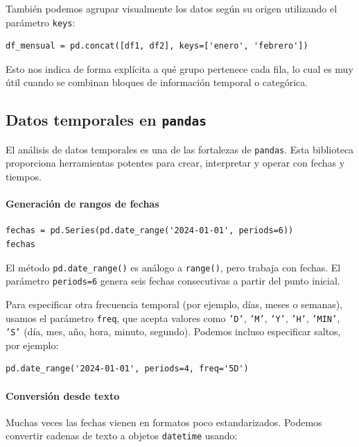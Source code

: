 \documentclass{article}
\theoremstyle{nonumberplain}
\begin{document}
También podemos agrupar visualmente los datos según su origen utilizando el parámetro \texttt{keys}:

\begin{verbatim}
df_mensual = pd.concat([df1, df2], keys=['enero', 'febrero'])
\end{verbatim}

Esto nos indica de forma explícita a qué grupo pertenece cada fila, lo cual es muy útil cuando se combinan bloques de información temporal o categórica.

\subsection*{Datos temporales en \texttt{pandas}}

El análisis de datos temporales es una de las fortalezas de \texttt{pandas}. Esta biblioteca proporciona herramientas potentes para crear, interpretar y operar con fechas y tiempos.

\paragraph{Generación de rangos de fechas}

\begin{verbatim}
fechas = pd.Series(pd.date_range('2024-01-01', periods=6))
fechas
\end{verbatim}

El método \texttt{pd.date\_range()} es análogo a \texttt{range()}, pero trabaja con fechas. El parámetro \texttt{periods=6} genera seis fechas consecutivas a partir del punto inicial.

Para especificar otra frecuencia temporal (por ejemplo, días, meses o semanas), usamos el parámetro \texttt{freq}, que acepta valores como \texttt{'D'}, \texttt{'M'}, \texttt{'Y'}, \texttt{'H'}, \texttt{'MIN'}, \texttt{'S'} (día, mes, año, hora, minuto, segundo). Podemos incluso especificar saltos, por ejemplo:

\begin{verbatim}
pd.date_range('2024-01-01', periods=4, freq='5D')
\end{verbatim}

\paragraph{Conversión desde texto}

Muchas veces las fechas vienen en formatos poco estandarizados. Podemos convertir cadenas de texto a objetos \texttt{datetime} usando:
\end{document}
